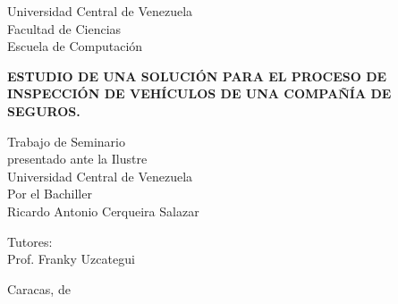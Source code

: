 \begin{center}
	Universidad Central de Venezuela\\
	Facultad de Ciencias\\
	Escuela de Computación\\
	
\end{center}

\vspace{2.5cm}
\begin{center}
	\large{\textbf{ ESTUDIO DE UNA SOLUCIÓN PARA EL PROCESO DE INSPECCIÓN DE VEHÍCULOS DE UNA COMPAÑÍA DE SEGUROS. }}
\end{center}

\vspace{6.0cm}
\begin{center}
	Trabajo de Seminario \\
	presentado ante la Ilustre\\
	Universidad Central de Venezuela\\
	Por el Bachiller\\
	Ricardo Antonio Cerqueira Salazar\\
\end{center}

\begin{center}
	Tutores:\\ Prof. Franky Uzcategui\\
\end{center}

\vspace{1.0cm}
\begin{center}
	Caracas, \monthname[\month] de \the\year
\end{center}